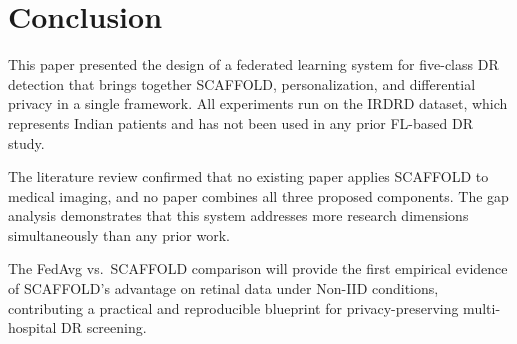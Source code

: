 \documentclass[10pt, conference]{IEEEtran}
\begin{document}
\section{Conclusion}

This paper presented the design of a federated learning system for five-class DR
detection that brings together SCAFFOLD, personalization, and differential
privacy in a single framework. All experiments run on the IRDRD dataset, which
represents Indian patients and has not been used in any prior FL-based DR study.

The literature review confirmed that no existing paper applies SCAFFOLD to
medical imaging, and no paper combines all three proposed components. The gap
analysis demonstrates that this system addresses more research dimensions
simultaneously than any prior work.

The FedAvg vs.\ SCAFFOLD comparison will provide the first empirical evidence of
SCAFFOLD's advantage on retinal data under Non-IID conditions, contributing a
practical and reproducible blueprint for privacy-preserving multi-hospital DR
screening.
\end{document}
